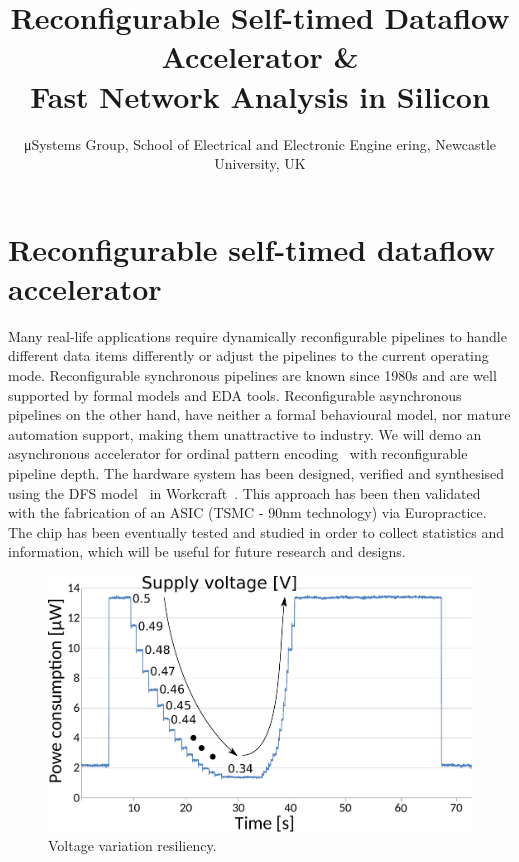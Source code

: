 \documentclass[conference]{IEEEtran}
\begin{document}
\title{Reconfigurable Self-timed Dataflow Accelerator \&\\Fast Network Analysis in Silicon}

\author{μSystems Group, School of Electrical and Electronic Engine
ering, Newcastle University, UK}

\maketitle


\IEEEpeerreviewmaketitle

\section*{Reconfigurable self-timed dataflow accelerator}
Many real-life applications require dynamically
reconfigurable pipelines to handle different data items differently or adjust
the pipelines to the current operating mode. Reconfigurable synchronous
pipelines are known since 1980s and are well
supported by formal models and EDA tools. Reconfigurable asynchronous
pipelines on the other hand, have neither a formal behavioural model, nor
mature automation support, making them unattractive to industry.
We will demo an asynchronous accelerator for ordinal pattern encoding~\cite{OPE} with
reconfigurable pipeline depth. The hardware system has been designed, verified and synthesised
using the DFS model~\cite{DFS} in Workcraft~\cite{workcraft_web}. This approach has been
then validated with the fabrication of an ASIC (TSMC - 90nm technology) via
Europractice. The chip has been eventually tested and studied in order to collect statistics
and information, which will be useful for future research and designs.

\begin{figure}[ht!]
\begin{center}
	\includegraphics[width=\linewidth]{FIG/voltage-var.pdf}
	\caption{Voltage variation resiliency.}
	\label{fig:voltage-var}
\end{center}
\vspace{-5mm}
\end{figure}
\end{document}
